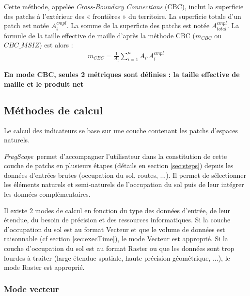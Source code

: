 \documentclass[11pt]{article}
\newcommand{\tool}{\emph{FragScape}}
\begin{document}
Cette méthode, appelée \textit{Cross-Boundary Connections} (CBC), inclut la superficie des patchs à l'extérieur des « frontières » du territoire. La superficie totale d'un patch est notée $A_{i}^{cmpl}$. La somme de la superficie des patchs est notée $A_{total}^{cmpl}$. La formule de la taille effective de maille d'après la méthode CBC ($m_{CBC}$ ou $CBC\_MSIZ$) est alors :
\hspace*{-2.5cm}
\begin{align*}
m_{CBC} = \frac{1}{A_{t}}\sum_{i=1}^{n}A_{i}.A_{i}^{cmpl}
\end{align*}

\hspace*{-2.5cm}
\textbf{\color{red}En mode CBC, seules 2 métriques sont définies : la taille effective de maille et le produit net}
\frameboxend


\subsection{Méthodes de calcul}
\label{sec:mode}

Le calcul des indicateurs se base sur une couche contenant les patchs d'espaces naturels.

\tool\ permet d'accompagner l'utilisateur dans la constitution de cette couche de patchs en plusieurs étapes (détails en section \ref{sec:steps}) depuis les données d'entrées brutes (occupation du sol, routes, ...). Il permet de sélectionner les éléments naturels et semi-naturels de l'occupation du sol puis de leur intégrer les données complémentaires.

Il existe 2 modes de calcul en fonction du type des données d'entrée, de leur étendue, du besoin de précision et des ressources informatiques. Si la couche d'occupation du sol est au format Vecteur et que le volume de données est raisonnable (cf section \ref{sec:execTime}), le mode Vecteur est approprié. Si la couche d'occupation du sol est au format Raster ou que les données sont trop lourdes à traiter (large étendue spatiale, haute précision géométrique, ...), le mode Raster est approprié.

\subsubsection{Mode vecteur}
\end{document}
